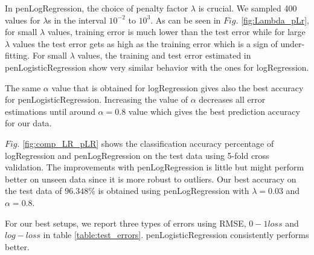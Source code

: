 In penLogRegression, the choice of penalty factor $\lambda$ is crucial. We sampled 400 values for $\lambda$s in the interval  $10^{-2}$ to $10^3$. As can be seen in $Fig.$ \ref{fig:Lambda_pLr}, for small $\lambda$ values, training error is much lower than the test error while for large $\lambda$ values the test error gets as high as the training error which is a sign of under-fitting. 
For small $\lambda$ values, the training and test error estimated in penLogisticRegression show very similar behavior with the ones for logRegression. 

The same $\alpha$ value that is obtained for logRegression gives also the best accuracy for penLogisticRegression. Increasing the value of $\alpha$ decreases all error estimations until around $\alpha=0.8$ value which gives the best prediction accuracy for our data.

$Fig.$ \ref{fig:comp_LR_pLR} shows the classification accuracy percentage of logRegression and penLogRegression on the test data using 5-fold cross validation. The improvements with penLogRegression is little but might perform better on unseen data since it is more robust to outliers. Our best accuracy on the test data of $96.348\%$  is obtained using penLogRegression with $\lambda=0.03$ and $\alpha=0.8$. 

For our best setups, we report three types of errors using RMSE, $0-1 loss$ and $log-loss$  in table \ref{table:test_errors}. penLogisticRegression consistently performs better.


